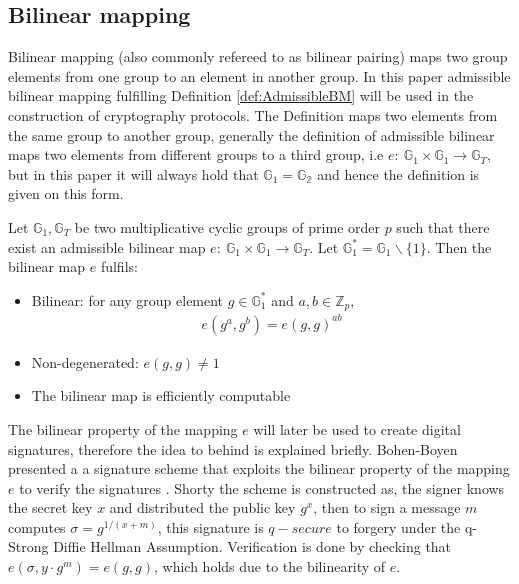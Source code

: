 \subsection*{Bilinear mapping}
\label{sec:bilinear}
Bilinear mapping (also commonly refereed to as bilinear pairing) maps two group elements from one group to an element in another group. In this paper admissible bilinear mapping fulfilling Definition \ref{def:AdmissibleBM} will be used in the construction of cryptography protocols.	The Definition maps two elements from the same group to another group, generally the definition of admissible bilinear maps two elements from different groups to a third group, i.e $e: \: \mathds{G}_1\times \mathds{G}_1 \to \mathds{G}_T$, but in this paper it will always hold that $\mathds{G}_1=\mathds{G_2}$ and hence the definition is given on this form. 
\begin{Mydef}
	\label{def:AdmissibleBM}
	Let $\mathds{G}_1,\mathds{G}_T$ be two multiplicative cyclic groups of prime order $p$ such that there exist an admissible bilinear map $e: \: \mathds{G}_1\times \mathds{G}_1 \to \mathds{G}_T$. Let $\mathds{G}_1^*=\mathds{G}_1\backslash \{1\}$.  Then the bilinear map $e$ fulfils:
	\begin{itemize}
		\item Bilinear: for any group element  $g\in\mathds{G}_1^*$ and $a,b \in \mathds{Z}_p$,
		\begin{align*}
			e(g^a,g^b) = e(g,g)^{ab}
		\end{align*}	
		\item Non-degenerated: $e(g,g)\neq 1$	 
		\item The bilinear map is efficiently computable
	\end{itemize}
\end{Mydef}

The bilinear property of the mapping $e$ will later be used to create digital signatures, therefore the idea to  behind is explained briefly.  Bohen-Boyen presented a a signature scheme that exploits the bilinear property of the mapping $e$ to verify the signatures \cite{Bohen-Boyen}. Shorty the scheme is constructed as, the signer knows the secret key $x$ and distributed the public key $g^x$, then to sign a message $m$ computes $\sigma = g^{1/(x+m)}$, this signature is $q-secure$ to forgery under the q-Strong Diffie Hellman Assumption. Verification is done by checking that $e(\sigma,y\cdot g^m) = e(g,g)$, which holds due to the bilinearity of $e$. 


